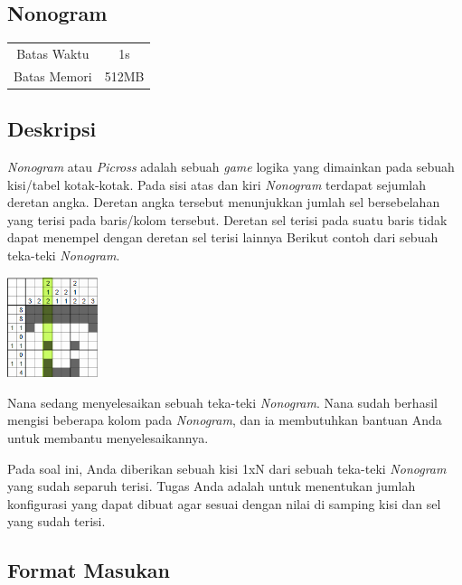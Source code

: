 \documentclass{article}
\begin{document}
\begin{center}
    \section*{Nonogram} %

    \begin{tabular}{ | c c | }
        \hline
        Batas Waktu  & 1s \\    %
        Batas Memori & 512MB \\  %
        \hline
    \end{tabular}
\end{center}

\subsection*{Deskripsi}

\textit{Nonogram} atau \textit{Picross} adalah sebuah \textit{game} logika yang dimainkan pada sebuah kisi/tabel kotak-kotak.
Pada sisi atas dan kiri \textit{Nonogram} terdapat sejumlah deretan angka.
Deretan angka tersebut menunjukkan jumlah sel bersebelahan yang terisi pada baris/kolom tersebut.
Deretan sel terisi pada suatu baris tidak dapat menempel dengan deretan sel terisi lainnya
Berikut contoh dari sebuah teka-teki \textit{Nonogram}.

\includegraphics[width=100px]{Homogram-Steve}

Nana sedang menyelesaikan sebuah teka-teki \textit{Nonogram}. 
Nana sudah berhasil mengisi beberapa kolom pada \textit{Nonogram}, dan ia membutuhkan bantuan Anda untuk membantu menyelesaikannya.

Pada soal ini, Anda diberikan sebuah kisi 1xN dari sebuah teka-teki \textit{Nonogram} yang sudah separuh terisi.
Tugas Anda adalah untuk menentukan jumlah konfigurasi yang dapat dibuat agar sesuai dengan nilai di samping kisi dan sel yang sudah terisi.

\subsection*{Format Masukan}
\end{document}
